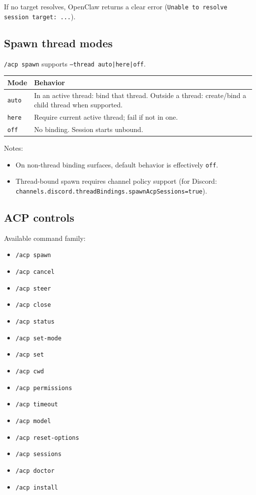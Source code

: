 If no target resolves, OpenClaw returns a clear error (\texttt{Unable to resolve session target: ...}).

\subsection{Spawn thread modes}


\texttt{/acp spawn} supports \texttt{--thread auto|here|off}.


\begin{table}[h]
\centering
\small
\begin{tabular}{|l|l|}
\hline
Mode & Behavior \\
\hline
\texttt{auto} & In an active thread: bind that thread. Outside a thread: create/bind a child thread when supported. \\
\hline
\texttt{here} & Require current active thread; fail if not in one. \\
\hline
\texttt{off} & No binding. Session starts unbound. \\
\hline
\end{tabular}
\end{table}



Notes:

\begin{itemize}
  \item On non-thread binding surfaces, default behavior is effectively \texttt{off}.
  \item Thread-bound spawn requires channel policy support (for Discord: \texttt{channels.discord.threadBindings.spawnAcpSessions=true}).
\end{itemize}


\subsection{ACP controls}


Available command family:

\begin{itemize}
  \item \texttt{/acp spawn}
  \item \texttt{/acp cancel}
  \item \texttt{/acp steer}
  \item \texttt{/acp close}
  \item \texttt{/acp status}
  \item \texttt{/acp set-mode}
  \item \texttt{/acp set}
  \item \texttt{/acp cwd}
  \item \texttt{/acp permissions}
  \item \texttt{/acp timeout}
  \item \texttt{/acp model}
  \item \texttt{/acp reset-options}
  \item \texttt{/acp sessions}
  \item \texttt{/acp doctor}
  \item \texttt{/acp install}
\end{itemize}


